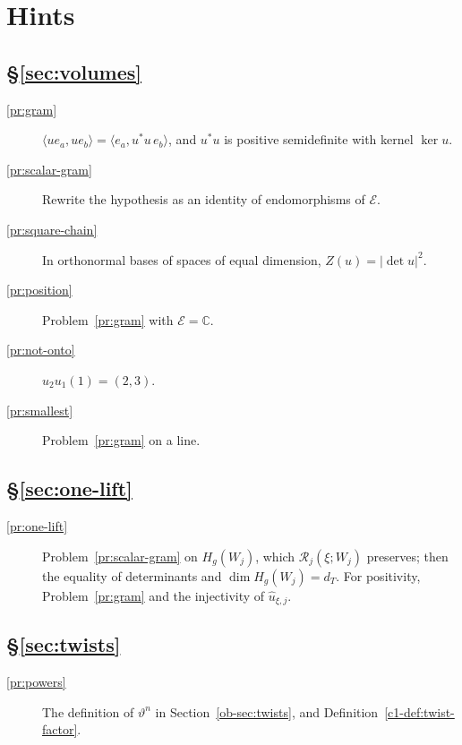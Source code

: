 \documentclass[reqno]{amsart}
\theoremstyle{definition}
\theoremstyle{plain}
\newcommand{\C}{\mathbb C}
\newcommand{\Rc}{\mathcal R}
\begin{document}
\section*{Hints}

\subsection*{\S\ref{sec:volumes}}
\begin{description}
\item[\ref{pr:gram}] \(\langle u e_a, u e_b\rangle = \langle e_a, u^*u\, e_b\rangle\), and \(u^*u\) is positive semidefinite with kernel \(\ker u\).
\item[\ref{pr:scalar-gram}] Rewrite the hypothesis as an identity of endomorphisms of \(\mathcal E\).
\item[\ref{pr:square-chain}] In orthonormal bases of spaces of equal dimension, \(Z(u) = \lvert\det u\rvert^2\).
\item[\ref{pr:position}] Problem~\ref{pr:gram} with \(\mathcal E = \C\).
\item[\ref{pr:not-onto}] \(u_2u_1(1) = (2, 3)\).
\item[\ref{pr:smallest}] Problem~\ref{pr:gram} on a line.
\end{description}

\subsection*{\S\ref{sec:one-lift}}
\begin{description}
\item[\ref{pr:one-lift}] Problem~\ref{pr:scalar-gram} on \(H_g(W_j)\), which \(\Rc_j(\xi; W_j)\) preserves; then the equality of determinants and \(\dim H_g(W_j) = d_T\).  For positivity, Problem~\ref{pr:gram} and the injectivity of \(\hat u_{\xi,j}\).
\end{description}

\subsection*{\S\ref{sec:twists}}
\begin{description}
\item[\ref{pr:powers}] The definition of \(\vartheta^n\) in Section~\ref{ob-sec:twists}, and Definition~\ref{c1-def:twist-factor}.
\end{description}
\end{document}
